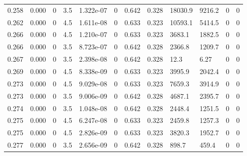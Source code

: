 \documentclass[preview]{standalone}
\begin{document}
{{{\begin{tabular}{L{1.2cm}C{1.2cm} C{0.3cm}C{0.5cm} C{1.4cm}C{1.4cm} C{1.4cm}C{1.4cm} C{1.6cm}C{1.6cm} C{1.6cm}C{1.6cm}}
  0.258  &  0.000  & 0     & 3.5 &  1.322e-07  & 0  &  0.642&   0.328& 18030.9 & 9216.2   &  0 & 0  \\ 
  0.262  &  0.000  & 0     & 4.5 &  1.611e-08  & 0  &  0.633&   0.323& 10593.1 & 5414.5   &  0 & 0  \\ 
  0.266  &  0.000  & 0     & 4.5 &  1.210e-07  & 0  &  0.633&   0.323& 3683.1 & 1882.5   &  0 & 0  \\ 
  0.266  &  0.000  & 0     & 3.5 &  8.723e-07  & 0  &  0.642&   0.328& 2366.8 & 1209.7   &  0 & 0  \\ 
  0.267  &  0.000  & 0     & 3.5 &  2.398e-08  & 0  &  0.642&   0.328& 12.3 & 6.27   &  0 & 0  \\ 
  0.269  &  0.000  & 0     & 4.5 &  8.338e-09  & 0  &  0.633&   0.323& 3995.9 & 2042.4   &  0 & 0  \\ 
  0.273  &  0.000  & 0     & 4.5 &  9.029e-08  & 0  &  0.633&   0.323& 7659.3 & 3914.9   &  0 & 0  \\ 
  0.273  &  0.000  & 0     & 3.5 &  9.006e-09  & 0  &  0.642&   0.328& 4687.1 & 2395.7   &  0 & 0  \\ 
  0.274  &  0.000  & 0     & 3.5 &  1.048e-08  & 0  &  0.642&   0.328& 2448.4 & 1251.5   &  0 & 0  \\ 
  0.275  &  0.000  & 0     & 4.5 &  6.247e-08  & 0  &  0.633&   0.323& 2459.8 & 1257.3   &  0 & 0  \\ 
  0.275  &  0.000  & 0     & 4.5 &  2.826e-09  & 0  &  0.633&   0.323& 3820.3 & 1952.7   &  0 & 0  \\ 
  0.277  &  0.000  & 0     & 3.5 &  2.656e-09  & 0  &  0.642&   0.328& 898.7 & 459.4   &  0 & 0  \\ 
\hline 
\end{tabular} 

}}}
\end{document}
